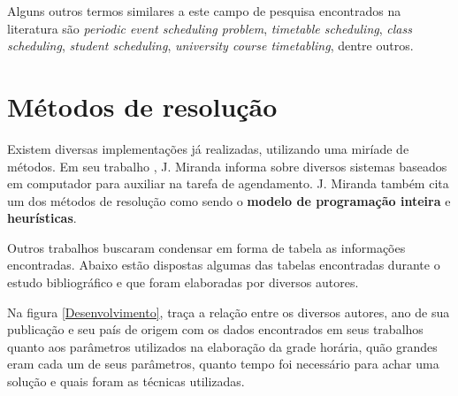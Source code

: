 Alguns outros termos similares a este campo de pesquisa encontrados na literatura são \textit{periodic event scheduling problem}, \textit{timetable scheduling}, \textit{class scheduling}, \textit{student scheduling}, \textit{university course timetabling}, dentre outros.

\section{Métodos de resolução} %



Existem diversas implementações já realizadas, utilizando uma miríade de métodos. Em seu trabalho \cite{miranda_udpskeduler_2012}, J. Miranda informa sobre diversos sistemas baseados em computador para auxiliar na tarefa de agendamento. J. Miranda também cita um dos métodos de resolução como sendo o \textbf{modelo de programação inteira} e \textbf{heurísticas}.

Outros trabalhos buscaram condensar em forma de tabela as informações encontradas. Abaixo estão dispostas algumas das tabelas encontradas durante o estudo bibliográfico e que foram elaboradas por diversos autores.

Na figura \ref{Desenvolvimento}, \cite{alegre_desenvolvimento_2012} traça a relação entre os diversos autores, ano de sua publicação e seu país de origem com os dados encontrados em seus trabalhos quanto aos parâmetros utilizados na elaboração da grade horária, quão grandes eram cada um de seus parâmetros, quanto tempo foi necessário para achar uma solução e quais foram as técnicas utilizadas.

